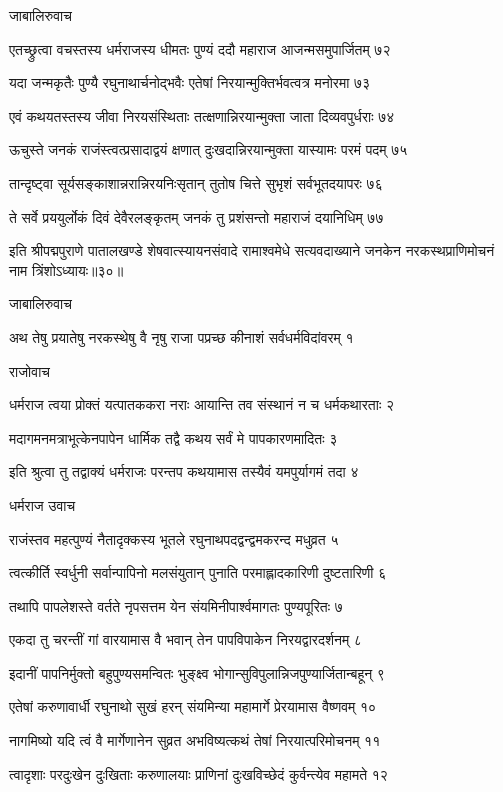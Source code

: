 जाबालिरुवाच

एतच्छ्रुत्वा वचस्तस्य धर्मराजस्य धीमतः
पुण्यं ददौ महाराज आजन्मसमुपार्जितम् ७२

यदा जन्मकृतैः पुण्यै रघुनाथार्चनोद्भवैः
एतेषां निरयान्मुक्तिर्भवत्वत्र मनोरमा ७३

एवं कथयतस्तस्य जीवा निरयसंस्थिताः
तत्क्षणान्निरयान्मुक्ता जाता दिव्यवपुर्धराः ७४

ऊचुस्ते जनकं राजंस्त्वत्प्रसादाद्वयं क्षणात्
दुःखदान्निरयान्मुक्ता यास्यामः परमं पदम् ७५

तान्दृष्ट्वा सूर्यसङ्काशान्नरान्निरयनिःसृतान्
तुतोष चित्ते सुभृशं सर्वभूतदयापरः ७६

ते सर्वे प्रययुर्लोकं दिवं देवैरलङ्कृतम्
जनकं तु प्रशंसन्तो महाराजं दयानिधिम् ७७

इति श्रीपद्मपुराणे पातालखण्डे शेषवात्स्यायनसंवादे रामाश्वमेधे सत्यवदाख्याने जनकेन नरकस्थप्राणिमोचनं नाम त्रिंशोऽध्यायः॥३०॥


जाबालिरुवाच

अथ तेषु प्रयातेषु नरकस्थेषु वै नृषु
राजा पप्रच्छ कीनाशं सर्वधर्मविदांवरम् १

राजोवाच

धर्मराज त्वया प्रोक्तं यत्पातककरा नराः
आयान्ति तव संस्थानं न च धर्मकथारताः २

मदागमनमत्राभूत्केनपापेन धार्मिक
तद्वै कथय सर्वं मे पापकारणमादितः ३

इति श्रुत्वा तु तद्वाक्यं धर्मराजः परन्तप
कथयामास तस्यैवं यमपुर्यागमं तदा ४

धर्मराज उवाच

राजंस्तव महत्पुण्यं नैतादृक्कस्य भूतले
रघुनाथपदद्वन्द्वमकरन्द मधुव्रत ५

त्वत्कीर्ति स्वर्धुनी सर्वान्पापिनो मलसंयुतान्
पुनाति परमाह्लादकारिणी दुष्टतारिणी ६

तथापि पापलेशस्ते वर्तते नृपसत्तम
येन संयमिनीपार्श्वमागतः पुण्यपूरितः ७

एकदा तु चरन्तीं गां वारयामास वै भवान्
तेन पापविपाकेन निरयद्वारदर्शनम् ८

इदानीं पापनिर्मुक्तो बहुपुण्यसमन्वितः
भुङ्क्ष्व भोगान्सुविपुलान्निजपुण्यार्जितान्बहून् ९

एतेषां करुणावार्धी रघुनाथो सुखं हरन्
संयमिन्या महामार्गे प्रेरयामास वैष्णवम् १०

नागमिष्यो यदि त्वं वै मार्गेणानेन सुव्रत
अभविष्यत्कथं तेषां निरयात्परिमोचनम् ११

त्वादृशाः परदुःखेन दुःखिताः करुणालयाः
प्राणिनां दुःखविच्छेदं कुर्वन्त्येव महामते १२

